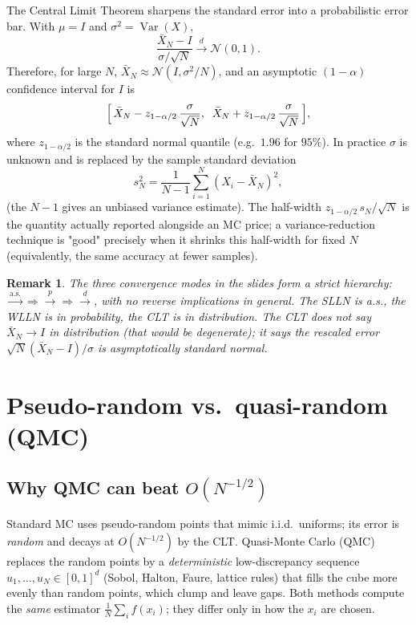 \documentclass[11pt]{article}
\newcommand{\Var}{\operatorname{Var}}
\newtheorem{remark}{Remark}
\begin{document}
The Central Limit Theorem sharpens the standard error into a probabilistic error bar.
With $\mu=I$ and $\sigma^2=\Var(X)$,
\[
\frac{\bar X_N-I}{\sigma/\sqrt N}\xrightarrow{d}\mathcal N(0,1).
\]
Therefore, for large $N$, $\bar X_N\approx\mathcal N(I,\sigma^2/N)$, and an
asymptotic $(1-\alpha)$ confidence interval for $I$ is
\[
\Bigl[\,\bar X_N-z_{1-\alpha/2}\,\frac{\sigma}{\sqrt N},\;\;
\bar X_N+z_{1-\alpha/2}\,\frac{\sigma}{\sqrt N}\,\Bigr],
\]
where $z_{1-\alpha/2}$ is the standard normal quantile (e.g.\ $1.96$ for $95\%$). In
practice $\sigma$ is unknown and is replaced by the sample standard deviation
\[
s_N^2=\frac{1}{N-1}\sum_{i=1}^N(X_i-\bar X_N)^2,
\]
(the $N-1$ gives an unbiased variance estimate). The half-width
$z_{1-\alpha/2}\,s_N/\sqrt N$ is the quantity actually reported alongside an MC price; a
variance-reduction technique is "good" precisely when it shrinks this half-width for
fixed $N$ (equivalently, the same accuracy at fewer samples).

\begin{remark}
The three convergence modes in the slides form a strict hierarchy:
$\xrightarrow{\text{a.s.}}\Rightarrow\xrightarrow{p}\Rightarrow\xrightarrow{d}$, with
no reverse implications in general. The SLLN is a.s., the WLLN is in probability, the
CLT is in distribution. The CLT does \emph{not} say $\bar X_N\to I$ in distribution
(that would be degenerate); it says the \emph{rescaled} error
$\sqrt N(\bar X_N-I)/\sigma$ is asymptotically standard normal.
\end{remark}

\section{Pseudo-random vs.\ quasi-random (QMC)}

\subsection{Why QMC can beat $O(N^{-1/2})$}

Standard MC uses pseudo-random points that mimic i.i.d.\ uniforms; its error is
\emph{random} and decays at $O(N^{-1/2})$ by the CLT. Quasi-Monte Carlo (QMC) replaces
the random points by a \emph{deterministic} low-discrepancy sequence
$u_1,\dots,u_N\in[0,1]^d$ (Sobol, Halton, Faure, lattice rules) that fills the cube more
evenly than random points, which clump and leave gaps. Both methods compute the
\emph{same} estimator $\frac1N\sum_i f(x_i)$; they differ only in how the $x_i$ are
chosen.
\end{document}
